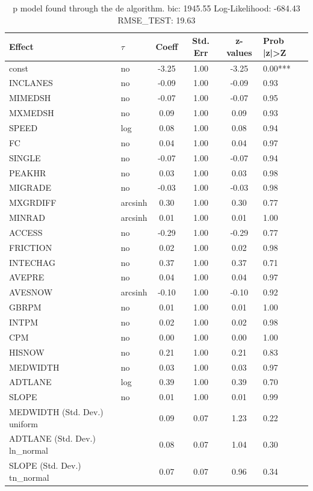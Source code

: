 \begin{table}
	\caption{p model found through the de algorithm. bic: 1945.55 Log-Likelihood: -684.43 RMSE_TEST: 19.63}
	\begin{center}
		\begin{tabular}{|l|l|c|c|c|l|}
			\hline
			Effect & $\tau$ & Coeff & Std. Err & z-values & Prob |z|>Z \\
			\hline
			const & no & -3.25 & 1.00 & -3.25 & 0.00*** \\
			\hline
			INCLANES & no & -0.09 & 1.00 & -0.09 & 0.93 \\
			\hline
			MIMEDSH & no & -0.07 & 1.00 & -0.07 & 0.95 \\
			\hline
			MXMEDSH & no & 0.09 & 1.00 & 0.09 & 0.93 \\
			\hline
			SPEED & log & 0.08 & 1.00 & 0.08 & 0.94 \\
			\hline
			FC & no & 0.04 & 1.00 & 0.04 & 0.97 \\
			\hline
			SINGLE & no & -0.07 & 1.00 & -0.07 & 0.94 \\
			\hline
			PEAKHR & no & 0.03 & 1.00 & 0.03 & 0.98 \\
			\hline
			MIGRADE & no & -0.03 & 1.00 & -0.03 & 0.98 \\
			\hline
			MXGRDIFF & arcsinh & 0.30 & 1.00 & 0.30 & 0.77 \\
			\hline
			MINRAD & arcsinh & 0.01 & 1.00 & 0.01 & 1.00 \\
			\hline
			ACCESS & no & -0.29 & 1.00 & -0.29 & 0.77 \\
			\hline
			FRICTION & no & 0.02 & 1.00 & 0.02 & 0.98 \\
			\hline
			INTECHAG & no & 0.37 & 1.00 & 0.37 & 0.71 \\
			\hline
			AVEPRE & no & 0.04 & 1.00 & 0.04 & 0.97 \\
			\hline
			AVESNOW & arcsinh & -0.10 & 1.00 & -0.10 & 0.92 \\
			\hline
			GBRPM & no & 0.01 & 1.00 & 0.01 & 1.00 \\
			\hline
			INTPM & no & 0.02 & 1.00 & 0.02 & 0.98 \\
			\hline
			CPM & no & 0.00 & 1.00 & 0.00 & 1.00 \\
			\hline
			HISNOW & no & 0.21 & 1.00 & 0.21 & 0.83 \\
			\hline
			MEDWIDTH & no & 0.03 & 1.00 & 0.03 & 0.97 \\
			\hline
			ADTLANE & log & 0.39 & 1.00 & 0.39 & 0.70 \\
			\hline
			SLOPE & no & 0.01 & 1.00 & 0.01 & 0.99 \\
			\hline
			MEDWIDTH (Std. Dev.) uniform &  & 0.09 & 0.07 & 1.23 & 0.22 \\
			\hline
			ADTLANE (Std. Dev.) ln_normal &  & 0.08 & 0.07 & 1.04 & 0.30 \\
			\hline
			SLOPE (Std. Dev.) tn_normal &  & 0.07 & 0.07 & 0.96 & 0.34 \\
			\hline
		\end{tabular}
	\end{center}
\end{table}